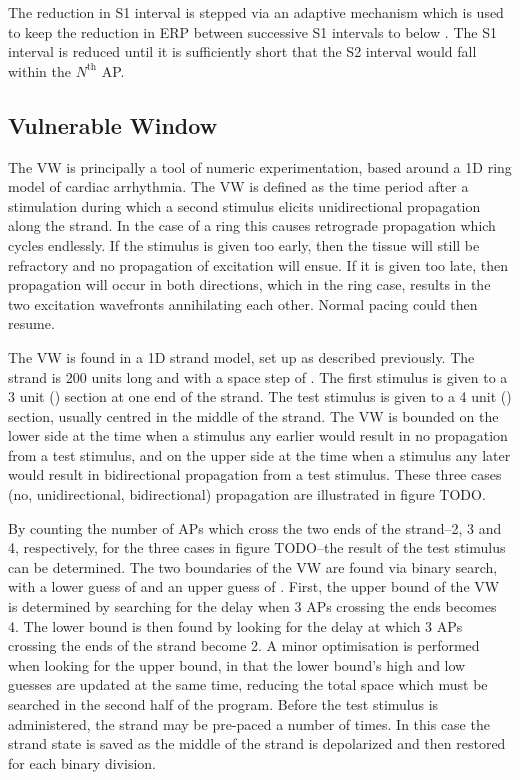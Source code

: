 The reduction in S1 interval is stepped via an adaptive mechanism which is
used to keep the reduction in ERP between successive S1 intervals to below
.  The S1 interval is reduced until it is sufficiently short that the
S2 interval would fall within the $N^{\text{th}}$ AP.

\subsection{Vulnerable Window}

The VW is principally a tool of numeric experimentation, based around a 1D ring
model of cardiac arrhythmia.  The VW is defined as the time period after a
stimulation during which a second stimulus elicits unidirectional propagation
along the strand.  In the case of a ring this causes retrograde propagation
which cycles endlessly.  If the stimulus is given too early, then the tissue
will still be refractory and no propagation of excitation will ensue.  If it is
given too late, then propagation will occur in both directions, which in the
ring case, results in the two excitation wavefronts annihilating each other.
Normal pacing could then resume.

The VW is found in a 1D strand model, set up as described previously.  The
strand is 200 units long and with a space step of .  The first stimulus is
given to a 3 unit () section at one end of the strand.  The test stimulus
is given to a 4 unit () section, usually centred in the middle of the
strand. The VW is bounded on the lower side at the time when a stimulus any
earlier would result in no propagation from a test stimulus, and on the upper
side at the time when a stimulus any later would result in bidirectional
propagation from a test stimulus.  These three cases (no, unidirectional,
bidirectional) propagation are illustrated in figure TODO.

By counting the number of APs which cross the two ends of the strand--2, 3 and
4, respectively, for the three cases in figure TODO--the result of the test
stimulus can be determined.  The two boundaries of the VW are found via binary
search, with a lower guess of  and an upper guess of .  First, the
upper bound of the VW is determined by searching for the delay when 3 APs
crossing the ends becomes 4.  The lower bound is then found by looking for the
delay at which 3 APs crossing the ends of the strand become 2.  A minor
optimisation is performed when looking for the upper bound, in that the lower
bound's high and low guesses are updated at the same time, reducing the total
space which must be searched in the second half of the program.  Before the test
stimulus is administered, the strand may be pre-paced a number of times.  In
this case the strand state is saved as the middle of the strand is depolarized
and then restored for each binary division.

